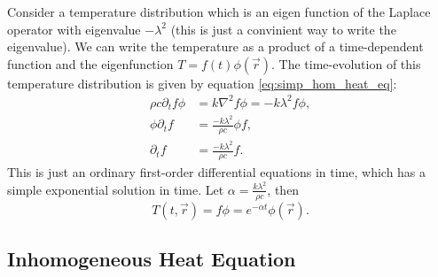 \documentclass[letterpaper,12pt]{article}
\begin{document}
Consider a temperature distribution which is an eigen function of the Laplace operator with eigenvalue $-\lambda^2$ (this is just a convinient way to write the eigenvalue). We can write the temperature as a product of a time-dependent function
and the eigenfunction $T = f(t) \phi(\vec{r})$.
The time-evolution of this temperature distribution is given by equation \ref{eq:simp_hom_heat_eq}:
\begin{align}
  \label{eq:eigen_heat}
  \rho c \partial_t f \phi &= k \nabla^2 f \phi = -k \lambda^2 f \phi, \\
     \phi\partial_t f &= \frac{-k \lambda^2}{\rho c} \phi f, \\
         \partial_t f &= \frac{-k \lambda^2}{\rho c} f.
\end{align}
This is just an ordinary first-order differential equations in time, which has
a simple exponential solution in time. Let $\alpha = \frac{k \lambda^2}{\rho c}$, then
\begin{equation}
  \label{eq:homo_heat_sol}
  T(t,\vec{r}) = f\phi = e^{-\alpha t} \phi(\vec{r}).
\end{equation}


\subsection{Inhomogeneous Heat Equation}
\end{document}
